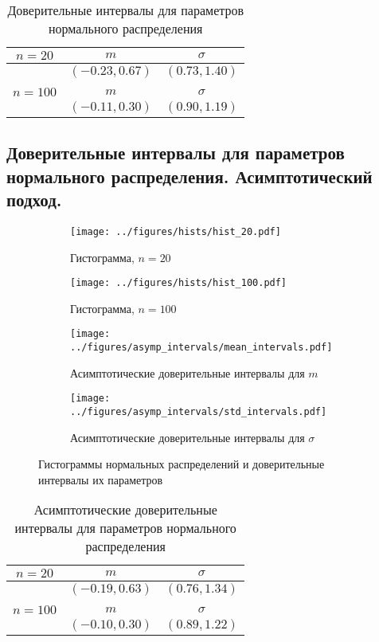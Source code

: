 \documentclass[12pt]{article}
\begin{document}
	\begin{table}[H]
		\centering
		\begin{tabular}{|c|c|c|} \hline
			$n = 20$ & $m$ & $\sigma$ \\ \hline 
			& $(-0.23,0.67)$ & $(0.73,1.40)$  \\ \hline
			& & \\ \hline
			$n = 100$ & $m$ & $\sigma$ \\ \hline 
			& $(-0.11,0.30)$ & $(0.90,1.19)$ \\ \hline
		\end{tabular}
		\caption{Доверительные интервалы для параметров нормального распределения}
	\end{table}

	\subsection{Доверительные интервалы для параметров нормального распределения. Асимптотический подход.}
	
	\begin{figure}[H]
		\centering
		\begin{subfigure}[t]{.45\linewidth}
			\centering\texttt{[image: ../figures/hists/hist\_20.pdf]}
			\caption*{Гистограмма, $n=20$}
		\end{subfigure}
		\begin{subfigure}[t]{.45\linewidth}
			\centering\texttt{[image: ../figures/hists/hist\_100.pdf]}
			\caption*{Гистограмма, $n=100$}
		\end{subfigure}
		\begin{subfigure}[t]{.45\linewidth}
			\centering\texttt{[image: ../figures/asymp\_intervals/mean\_intervals.pdf]}
			\caption*{Асимптотические доверительные интервалы для $m$}
		\end{subfigure}
		\begin{subfigure}[t]{.45\linewidth}
			\centering\texttt{[image: ../figures/asymp\_intervals/std\_intervals.pdf]}
			\caption*{Асимптотические доверительные интервалы для $\sigma$}
		\end{subfigure}
		\caption{Гистограммы нормальных распределений и доверительные интервалы их параметров}
	\end{figure}
	
	\begin{table}[H]
		\centering
		\begin{tabular}{|c|c|c|} \hline
			$n = 20$ & $m$ & $\sigma$ \\ \hline 
			& $(-0.19,0.63)$ & $(0.76,1.34)$  \\ \hline
			& & \\ \hline
			$n = 100$ & $m$ & $\sigma$ \\ \hline 
			& $(-0.10,0.30)$ & $(0.89,1.22)$ \\ \hline
		\end{tabular}
		\caption{Асимптотические доверительные интервалы для параметров нормального распределения}
	\end{table}
\end{document}
